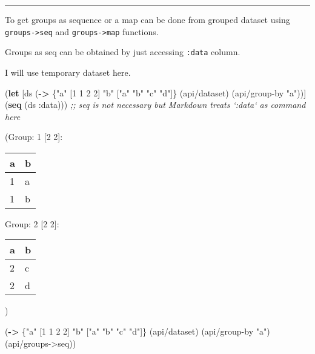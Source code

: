 \documentclass[]{article}
\newenvironment{Shaded}{\begin{snugshade}}{\end{snugshade}}
\newcommand{\KeywordTok}[1]{\textcolor[rgb]{0.13,0.29,0.53}{\textbf{#1}}}
\newcommand{\DecValTok}[1]{\textcolor[rgb]{0.00,0.00,0.81}{#1}}
\newcommand{\StringTok}[1]{\textcolor[rgb]{0.31,0.60,0.02}{#1}}
\newcommand{\CommentTok}[1]{\textcolor[rgb]{0.56,0.35,0.01}{\textit{#1}}}
\newcommand{\AttributeTok}[1]{\textcolor[rgb]{0.77,0.63,0.00}{#1}}
\newcommand{\NormalTok}[1]{#1}
\begin{document}
\begin{center}\rule{0.5\linewidth}{0.5pt}\end{center}

To get groups as sequence or a map can be done from grouped dataset
using \texttt{groups-\textgreater{}seq} and
\texttt{groups-\textgreater{}map} functions.

Groups as seq can be obtained by just accessing \texttt{:data} column.

I will use temporary dataset here.

\begin{Shaded}
\begin{Highlighting}[]
\NormalTok{(}\KeywordTok{let}\NormalTok{ [ds (}\KeywordTok{->}\NormalTok{ \{}\StringTok{"a"}\NormalTok{ [}\DecValTok{1} \DecValTok{1} \DecValTok{2} \DecValTok{2}\NormalTok{]}
              \StringTok{"b"}\NormalTok{ [}\StringTok{"a"} \StringTok{"b"} \StringTok{"c"} \StringTok{"d"}\NormalTok{]\}}
\NormalTok{             (api/dataset)}
\NormalTok{             (api/group-by }\StringTok{"a"}\NormalTok{))]}
\NormalTok{  (}\KeywordTok{seq}\NormalTok{ (ds }\AttributeTok{:data}\NormalTok{))) }\CommentTok{;; seq is not necessary but Markdown treats `:data` as command here}
\end{Highlighting}
\end{Shaded}

(Group: 1 {[}2 2{]}:

\begin{longtable}[]{@{}ll@{}}
\toprule
a & b\tabularnewline
\midrule
\endhead
1 & a\tabularnewline
1 & b\tabularnewline
\bottomrule
\end{longtable}

Group: 2 {[}2 2{]}:

\begin{longtable}[]{@{}ll@{}}
\toprule
a & b\tabularnewline
\midrule
\endhead
2 & c\tabularnewline
2 & d\tabularnewline
\bottomrule
\end{longtable}

)

\begin{Shaded}
\begin{Highlighting}[]
\NormalTok{(}\KeywordTok{->}\NormalTok{ \{}\StringTok{"a"}\NormalTok{ [}\DecValTok{1} \DecValTok{1} \DecValTok{2} \DecValTok{2}\NormalTok{]}
     \StringTok{"b"}\NormalTok{ [}\StringTok{"a"} \StringTok{"b"} \StringTok{"c"} \StringTok{"d"}\NormalTok{]\}}
\NormalTok{    (api/dataset)}
\NormalTok{    (api/group-by }\StringTok{"a"}\NormalTok{)}
\NormalTok{    (api/groups->seq))}
\end{Highlighting}
\end{Shaded}
\end{document}
